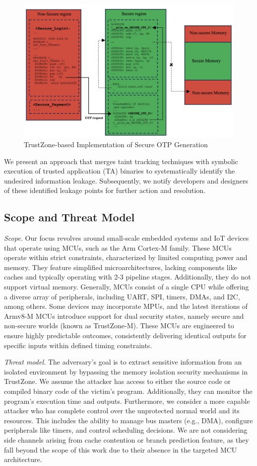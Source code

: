 \begin{figure}
  \centering
  \includegraphics[width=.8\textwidth]{figures/OTP.jpg}
  \caption{TrustZone-based Implementation of Secure OTP Generation}
  \label{fig:OTP}
\end{figure}

We present an approach that merges taint tracking techniques with symbolic execution of trusted application (\ac{TA}) binaries to systematically identify the undesired information leakage. Subsequently, we notify developers and designers of these identified leakage points for further action and resolution. 

\subsection{Scope and Threat Model}

\textit{Scope.} Our focus revolves around small-scale embedded systems and IoT devices that operate using MCUs, such as the Arm Cortex-M family. These MCUs operate within strict constraints, characterized by limited computing power and memory. They feature simplified microarchitectures, lacking components like caches and typically operating with 2-3 pipeline stages. Additionally, they do not support virtual memory. Generally, MCUs consist of a single CPU while offering a diverse array of peripherals, including UART, SPI, timers, DMAs, and I2C, among others. Some devices may incorporate MPUs, and the latest iterations of Armv8-M MCUs introduce support for dual security states, namely secure and non-secure worlds (known as TrustZone-M). These MCUs are engineered to ensure highly predictable outcomes, consistently delivering identical outputs for specific inputs within defined timing constraints.

\textit{Threat model.} The adversary’s goal is to extract sensitive information from an isolated environment by bypassing the memory isolation security mechanisms in TrustZone. We assume the attacker has access to either the source code or compiled binary code of the victim's program. Additionally, they can monitor the program's execution time and outputs. Furthermore, we consider a more capable attacker who has complete control over the unprotected normal world and its resources. This includes the ability to manage bus masters (e.g., DMA), configure peripherals like timers, and control scheduling decisions. We are not considering side channels arising from cache contention or branch prediction feature, as they fall beyond the scope of this work due to their absence in the targeted MCU architecture.

